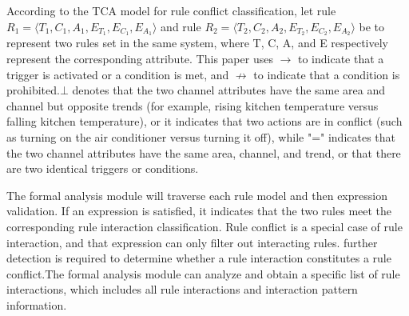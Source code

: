 According to the TCA model for rule conflict classification, let rule $R_1=\langle T_1,C_1,A_1,E_{T_1},E_{C_1},E_{A_1} \rangle$ and rule  $R_2=\langle T_2,C_2,A_2,E_{T_2},E_{C_2},E_{A_2} \rangle$ be to represent two rules set in the same system, where T, C, A, and E respectively represent the corresponding attribute. This paper uses $\rightarrow$ to indicate that a trigger is activated or a condition is met, and $\nrightarrow$ to indicate that a condition is prohibited.$\bot$ denotes that the two channel attributes have the same area and channel but opposite trends (for example, rising kitchen temperature versus falling kitchen temperature), or it indicates that two actions are in conflict (such as turning on the air conditioner versus turning it off), while "=" indicates that the two channel attributes have the same area, channel, and trend, or that there are two identical triggers or conditions.

The formal analysis module will traverse each rule model and then expression validation. If an expression is satisfied, it indicates that the two rules meet the corresponding rule interaction classification. Rule conflict is a special case of rule interaction, and that expression can only filter out interacting rules. further detection is required to determine whether a rule interaction constitutes a rule conflict.The formal analysis module can analyze and obtain a specific list of rule interactions, which includes all rule interactions and interaction pattern information.

